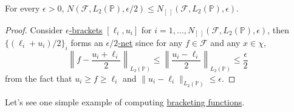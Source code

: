 \begin{lemma}
	For every \(\epsilon > 0\), \(N(\mathscr{F} , L_2(\mathbb{P} ), \epsilon / 2) \leq N_{[\ ]}(\mathscr{F} , L_2(\mathbb{P} ), \epsilon )\).
\end{lemma}
\begin{proof}
	Consider \hyperref[def:eps-bracket]{\(\epsilon \)-brackets} \([\ell _i, u_i]\) for \(i = 1, \dots , N_{[\ ]}(\mathscr{F} , L_2(\mathbb{P} ), \epsilon )\), then \(\{ (\ell _i + u_i) / 2 \}_i\) forms an \hyperref[def:eps-net]{\(\epsilon / 2\)-net} since for any \(f\in\mathscr{F} \) and any \(x\in \chi \),
	\[
		\left\lVert f - \frac{u_i + \ell _i}{2} \right\rVert _{L_2(\mathbb{P} )}
		\leq \left\lVert \frac{u_i - \ell _i}{2} \right\rVert _{L_2(\mathbb{P} )}
		\leq \frac{\epsilon}{2}
	\]
	from the fact that \(u_i \geq f \geq \ell _i\) and \(\lVert u_i - \ell _i \rVert _{L_2(\mathbb{P} )} \leq \epsilon \).
\end{proof}

Let's see one simple example of computing \hyperref[def:eps-bracket]{bracketing functions}.

